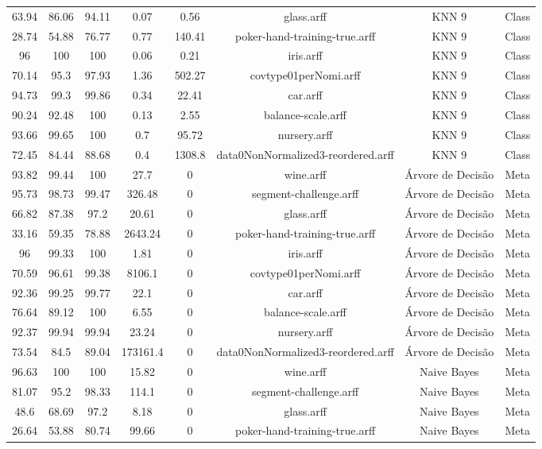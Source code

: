 \begin{longtable}{@{\extracolsep{}}cccccccc}
63.94	&	86.06	&	94.11	&	0.07	&	0.56	&	 glass.arff	&	 KNN 9	&	Class	\\
28.74	&	54.88	&	76.77	&	0.77	&	140.41	&	 poker-hand-training-true.arff	&	 KNN 9	&	Class	\\
96	&	100	&	100	&	0.06	&	0.21	&	 iris.arff	&	 KNN 9	&	Class	\\
70.14	&	95.3	&	97.93	&	1.36	&	502.27	&	 covtype01perNomi.arff	&	 KNN 9	&	Class	\\
94.73	&	99.3	&	99.86	&	0.34	&	22.41	&	 car.arff	&	 KNN 9	&	Class	\\
90.24	&	92.48	&	100	&	0.13	&	2.55	&	 balance-scale.arff	&	 KNN 9	&	Class	\\
93.66	&	99.65	&	100	&	0.7	&	95.72	&	 nursery.arff	&	 KNN 9	&	Class	\\
72.45	&	84.44	&	88.68	&	0.4	&	1308.8	&	 data0NonNormalized3-reordered.arff	&	 KNN 9	&	Class	\\
93.82	&	99.44	&	100	&	27.7	&	0	&	 wine.arff	&	 Árvore de Decisão	&	Meta	\\
95.73	&	98.73	&	99.47	&	326.48	&	0	&	 segment-challenge.arff	&	 Árvore de Decisão	&	Meta	\\
66.82	&	87.38	&	97.2	&	20.61	&	0	&	 glass.arff	&	 Árvore de Decisão	&	Meta	\\
33.16	&	59.35	&	78.88	&	2643.24	&	0	&	 poker-hand-training-true.arff	&	 Árvore de Decisão	&	Meta	\\
96	&	99.33	&	100	&	1.81	&	0	&	 iris.arff	&	 Árvore de Decisão	&	Meta	\\
70.59	&	96.61	&	99.38	&	8106.1	&	0	&	 covtype01perNomi.arff	&	 Árvore de Decisão	&	Meta	\\
92.36	&	99.25	&	99.77	&	22.1	&	0	&	 car.arff	&	 Árvore de Decisão	&	Meta	\\
76.64	&	89.12	&	100	&	6.55	&	0	&	 balance-scale.arff	&	 Árvore de Decisão	&	Meta	\\
92.37	&	99.94	&	99.94	&	23.24	&	0	&	 nursery.arff	&	 Árvore de Decisão	&	Meta	\\
73.54	&	84.5	&	89.04	&	173161.4	&	0	&	 data0NonNormalized3-reordered.arff	&	 Árvore de Decisão	&	Meta	\\
96.63	&	100	&	100	&	15.82	&	0	&	 wine.arff	&	 Naive Bayes	&	Meta	\\
81.07	&	95.2	&	98.33	&	114.1	&	0	&	 segment-challenge.arff	&	 Naive Bayes	&	Meta	\\
48.6	&	68.69	&	97.2	&	8.18	&	0	&	 glass.arff	&	 Naive Bayes	&	Meta	\\
26.64	&	53.88	&	80.74	&	99.66	&	0	&	 poker-hand-training-true.arff	&	 Naive Bayes	&	Meta	\\

\end{longtable}
